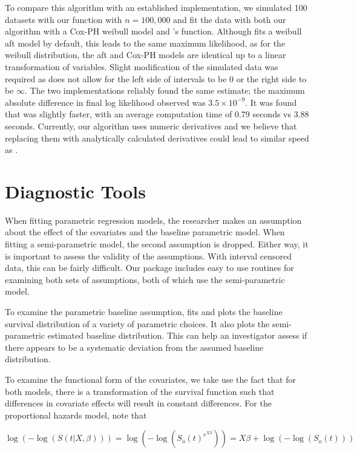 \documentclass[article]{jss}
\begin{document}
	To compare this algorithm with an established implementation, we simulated 100 datasets with our function  with $n = 100,000$ and fit the data with both our algorithm with a Cox-PH weibull model and 's  function. Although  fits a weibull aft model by default, this leads to the same maximum likelihood, as for the weibull distribution, the aft and Cox-PH models are identical up to a linear transformation of variables. Slight modification of the simulated data was required as  does not allow for the left side of intervals to be 0 or the right side to be $\infty$. The two implementations reliably found the same estimate;  the maximum absolute difference in final log likelihood observed was  $3.5 \times 10^{-9}$. It was found that  was slightly faster, with an average computation time of 0.79 seconds vs 3.88 seconds. Currently, our algorithm uses numeric derivatives and we believe that replacing them with analytically calculated derivatives could lead to similar speed as . 

{\section[diagnosis] {Diagnostic Tools} }	

	When fitting parametric regression models, the researcher makes an assumption about the effect of the covariates and the baseline parametric model. When fitting a semi-parametric model, the second assumption is dropped. Either way, it is important to assess the validity of the assumptions. With interval censored data, this can be fairly difficult. Our package includes easy to use routines for examining both sets of assumptions, both of which use the semi-parametric model. 
	
	To examine the parametric baseline assumption,  fits and plots the baseline survival distribution of a variety of parametric choices. It also plots the semi-parametric estimated baseline distribution. This can help an investigator assess if there appears to be a systematic deviation from the assumed baseline distribution. 
	
	To examine the functional form of the covariates, we take use the fact that for both models, there is a transformation of the survival function such that differences in covariate effects will result in constant differences. For the proportional hazards model, note that
	
\[
\log(-\log( S(t | X, \beta) ) ) = \log ( -\log( S_o( t ) ^{e^{X \beta} } ) ) =X \beta + \log( - \log( S_o( t) ) ) 
\]
\end{document}

